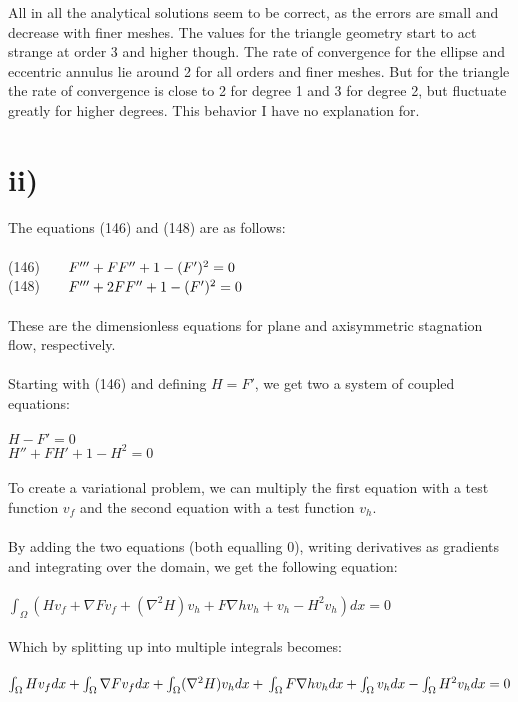 \documentclass[a4paper,english,11pt,twoside]{article}
\newcommand{\tab}{\hspace*{2em}}
\begin{document}
All in all the analytical solutions seem to be correct, as the errors are small and decrease with finer meshes. The values for the triangle geometry start to act strange at order 3 and higher though. The rate of convergence for the ellipse and eccentric annulus lie around 2 for all orders and finer meshes. But for the triangle the rate of convergence is close to 2 for degree 1 and 3 for degree 2, but fluctuate greatly for higher degrees. This behavior I have no explanation for.

\newpage
\section*{ii)}
The equations (146) and (148) are as follows:\\
\\
(146)$\tab F''' + FF'' + 1 - (F')^2 = 0$\\
(148)$\tab F''' + 2FF'' + 1 - (F')^2 = 0$\\
\\
These are the dimensionless equations for plane and axisymmetric stagnation flow, respectively.\\
\\
Starting with (146) and defining $H = F'$, we get two a system of coupled equations:\\
\\
$H - F' = 0$\\
$H'' + FH' + 1 - H^2 = 0$\\
\\
To create a variational problem, we can multiply the first equation with a test function $v_f$ and the second equation with a test function $v_h$.\\
\\
By adding the two equations (both equalling 0), writing derivatives as gradients and integrating over the domain, we get the following equation:\\
\\
$\int_{\Omega}(Hv_f + \nabla F v_f + (\nabla^2 H) v_h + F \nabla h v_h + v_h - H^2v_h)dx = 0$\\
\\
Which by splitting up into multiple integrals becomes:\\
\\
$\int_{\Omega}Hv_fdx + \int_{\Omega}\nabla F v_fdx + \int_{\Omega}(\nabla^2 H) v_hdx +\\
\\
 \int_{\Omega} F \nabla h v_hdx + \int_{\Omega}v_hdx - \int_{\Omega}H^2v_hdx = 0$\\
\end{document}
